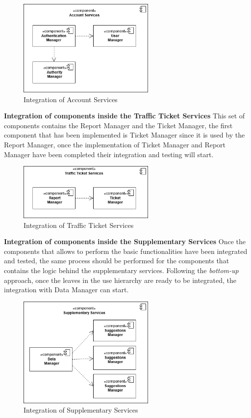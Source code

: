     \begin{figure}[H]
         \centering
          \includegraphics[width=0.6\textwidth]{Images/account_service.png}
        \caption{Integration of Account Services}
    \end{figure}
\noindent\textbf{Integration of components inside the Traffic Ticket Services }\newline
This set of components contains the Report Manager and the Ticket Manager, the first component that has been implemented is Ticket Manager since it is used by the Report Manager, once the implementation of Ticket Manager and Report Manager have been completed their integration and testing will start.
     \begin{figure}[H]
         \centering
          \includegraphics[width=0.6\textwidth]{Images/tt_services.png}
        \caption{Integration of Traffic Ticket Services}
    \end{figure}

    \noindent\textbf{Integration of components inside the Supplementary Services }\newline
    Once the components that allows to perform the basic functionalities have been integrated and tested, the same process should be performed for the components that contains the logic behind the supplementary services. Following the \textit{bottom-up} approach, once the leaves in the use hierarchy are ready to be integrated, the integration with Data Manager can start.
         \begin{figure}[H]
             \centering
          \includegraphics[width=0.6\textwidth]{Images/supplementary_services.png}
        \caption{Integration of Supplementary Services}
    \end{figure}

